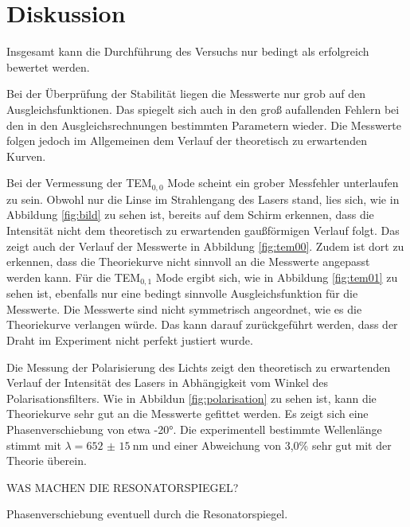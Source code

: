 \section{Diskussion}
\label{sec:Diskussion}
Insgesamt kann die Durchführung des Versuchs nur bedingt als erfolgreich
bewertet werden.

Bei der Überprüfung der Stabilität liegen die Messwerte nur grob auf den
Ausgleichsfunktionen. Das spiegelt sich auch in den groß aufallenden Fehlern bei
den in den Ausgleichsrechnungen bestimmten Parametern wieder. Die Messwerte folgen
jedoch im Allgemeinen dem Verlauf der theoretisch zu erwartenden Kurven.

Bei der Vermessung der TEM$_{\mathrm{0,0}}$ Mode scheint ein grober Messfehler
unterlaufen zu sein. Obwohl nur die Linse im Strahlengang des Lasers
stand, lies sich, wie in Abbildung \ref{fig:bild} zu sehen ist, bereits auf dem
Schirm erkennen, dass die Intensität nicht dem theoretisch zu erwartenden gaußförmigen
Verlauf folgt. Das zeigt auch der Verlauf der Messwerte in Abbildung \ref{fig:tem00}.
Zudem ist dort zu erkennen, dass die Theoriekurve nicht sinnvoll an die Messwerte
angepasst werden kann.
Für die TEM$_{\mathrm{0,1}}$ Mode ergibt sich, wie in Abbildung \ref{fig:tem01} zu
sehen ist, ebenfalls nur eine bedingt sinnvolle Ausgleichsfunktion für die Messwerte.
Die Messwerte sind nicht symmetrisch angeordnet, wie es die Theoriekurve verlangen würde.
Das kann darauf zurückgeführt werden, dass der Draht im Experiment nicht perfekt
justiert wurde.

Die Messung der Polarisierung des Lichts zeigt den theoretisch zu erwartenden Verlauf
der Intensität des Lasers in Abhängigkeit vom Winkel des Polarisationsfilters. Wie
in Abbildun \ref{fig:polarisation} zu sehen ist, kann die Theoriekurve sehr gut an
die Messwerte gefittet werden. Es zeigt sich eine Phasenverschiebung von etwa -20°.
Die experimentell bestimmte Wellenlänge stimmt mit $\lambda=\SI{652(15)}{\nano\metre}$
und einer Abweichung von 3{,}0\% sehr gut mit der Theorie überein.

WAS MACHEN DIE RESONATORSPIEGEL?

Phasenverschiebung eventuell durch die Resonatorspiegel.

